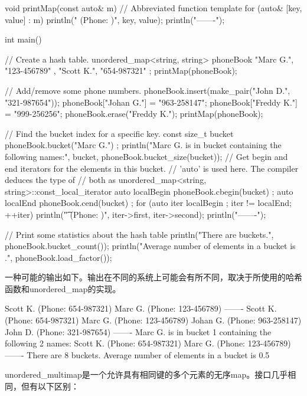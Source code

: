 \begin{cpp}
void printMap(const auto& m) // Abbreviated function template
{
    for (auto& [key, value] : m) {
        println("{} (Phone: {})", key, value);
    }
    println("-------");
}

int main()
{
    // Create a hash table.
    unordered_map<string, string> phoneBook {
        { "Marc G.", "123-456789" },
        { "Scott K.", "654-987321" } };
    printMap(phoneBook);

    // Add/remove some phone numbers.
    phoneBook.insert(make_pair("John D.", "321-987654"));
    phoneBook["Johan G."] = "963-258147";
    phoneBook["Freddy K."] = "999-256256";
    phoneBook.erase("Freddy K.");
    printMap(phoneBook);

    // Find the bucket index for a specific key.
    const size_t bucket { phoneBook.bucket("Marc G.") };
    println("Marc G. is in bucket {} containing the following {} names:",
        bucket, phoneBook.bucket_size(bucket));
    // Get begin and end iterators for the elements in this bucket.
    // 'auto' is used here. The compiler deduces the type of
    // both as unordered_map<string, string>::const_local_iterator
    auto localBegin { phoneBook.cbegin(bucket) };
    auto localEnd { phoneBook.cend(bucket) };
    for (auto iter { localBegin }; iter != localEnd; ++iter) {
        println("\t{} (Phone: {})", iter->first, iter->second);
    }
    println("-------");

    // Print some statistics about the hash table
    println("There are {} buckets.", phoneBook.bucket_count());
    println("Average number of elements in a bucket is {}.",
    phoneBook.load_factor());
}
\end{cpp}

一种可能的输出如下。输出在不同的系统上可能会有所不同，取决于所使用的哈希函数和unordered\_map的实现。

\begin{shell}
Scott K. (Phone: 654-987321)
Marc G. (Phone: 123-456789)
-------
Scott K. (Phone: 654-987321)
Marc G. (Phone: 123-456789)
Johan G. (Phone: 963-258147)
John D. (Phone: 321-987654)
-------
Marc G. is in bucket 1 containing the following 2 names:
        Scott K. (Phone: 654-987321)
        Marc G. (Phone: 123-456789)
-------
There are 8 buckets.
Average number of elements in a bucket is 0.5
\end{shell}


unordered\_multimap是一个允许具有相同键的多个元素的无序map。接口几乎相同，但有以下区别：

